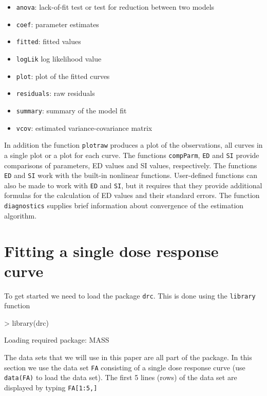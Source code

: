 \documentclass[a4paper]{article}
\begin{document}
\begin{itemize}
\item \verb+anova+: lack-of-fit test or test for reduction between two models
\item \verb+coef+: parameter estimates
\item \verb+fitted+: fitted values
\item \verb+logLik+ log likelihood value
\item \verb+plot+: plot of the fitted curves
\item \verb+residuals+: raw residuals
\item \verb+summary+: summary of the model fit
\item \verb+vcov+: estimated variance-covariance matrix
\end{itemize} 

In addition the function \verb+plotraw+ produces a plot of the observations, all curves in a single plot or a plot for each curve.
The functions \verb+compParm+, \verb+ED+ and \verb+SI+ provide comparisons of parameters, ED values and SI values, respectively. 
The functions \verb+ED+ and \verb+SI+ work with the built-in nonlinear functions. User-defined functions can also be made to work with \verb+ED+ 
and \verb+SI+, but it requires that they provide additional formulas for the calculation of ED values and their standard errors.
The function \verb+diagnostics+ supplies brief information about convergence of the estimation algorithm.




\newpage
\section{Fitting a single dose response curve} \label{sec:4}

To get started we need to load the package \verb+drc+. This is done using the \verb+library+ function

\begin{Schunk}
\begin{Sinput}
> library(drc)
\end{Sinput}
\begin{Soutput}
Loading required package: MASS
\end{Soutput}
\end{Schunk}
The data sets that we will use in this paper are all part of the package. In this section we use the data set \verb+FA+
consisting of a single dose response curve (use \verb+data(FA)+ to load the data set). The first 5 lines (rows) of the data set are 
displayed by typing \verb+FA[1:5,]+
\end{document}
